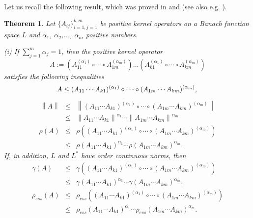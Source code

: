 \documentclass[12pt, reqno]{amsart}
\newtheorem{theorem}{Theorem}[section]
\theoremstyle{definition}
\theoremstyle{remark}
\numberwithin{equation}{section}
\newcommand{\be}{\begin{equation}}
\newcommand{\ee}{\end{equation}}
\begin{document}
 Let us recall  the following result, which was proved in \cite[Theorem 2.2]{DP05} and
\cite[Theorem 5.1 and Example 3.7]{P06} (see also e.g. \cite[Theorem 2.1]{P17}).

\begin{theorem}
\label{thbegin}
Let $\{A_{i j}\}_{i=1, j=1}^{k, m}$ be positive kernel operators on a Banach function space $L$ and  $\alpha _1$, $\alpha _2$,..., $\alpha _m$  positive numbers.

\noindent (i) If %
$\sum_{j=1}^{m} \alpha _j = 1$, then the positive kernel operator
\be
A:= \left(A_{1 1}^{(\alpha _1)} \circ \cdots \circ A_{1 m}^{(\alpha _m)}\right) \ldots \left(A_{k 1}^{(\alpha _1)} \circ \cdots \circ A_{k m}^{(\alpha _m)} \right)
\label{osnovno}
\ee
satisfies the following inequalities
\begin{equation}
A \le
(A_{1 1} \cdots  A_{k 1})^{(\alpha _1)} \circ \cdots
\circ (A_{1 m} \cdots A_{k m})^{(\alpha _m)} , \\
\label{norm2}
\end{equation}
\begin{eqnarray}
\nonumber
\left\|A \right\| &\le &\left\|(A_{1 1} \cdots  A_{k 1})^{(\alpha _1)} \circ \cdots
\circ (A_{1 m} \cdots A_{k m})^{(\alpha _m)} \right\|\\
&\le&\left\|A_{1 1} \cdots  A_{k 1}\right\|^{\alpha _1}\cdots\left\|A_{1 m} \cdots  A_{k m}\right\|^{\alpha _m}
\label{spectral2}
\end{eqnarray}
\begin{eqnarray}
\nonumber
\rho \left(A \right)& \le &\rho \left((A_{1 1} \cdots  A_{k 1})^{(\alpha _1)} \circ \cdots
\circ (A_{1 m} \cdots A_{k m})^{(\alpha _m)}\right)\\
&\le&\rho \left( A_{1 1} \cdots  A_{k 1} \right)^{\alpha _1} \cdots
\rho \left( A_{1 m} \cdots A_{k m}\right)^{\alpha _m} .
\label{tri}
\end{eqnarray}
If, in addition, $L$ and $L^*$ have order continuous norms, then%
\begin{eqnarray}
\nonumber
\gamma (A) & \le &\gamma \left((A_{1 1} \cdots  A_{k 1})^{(\alpha _1)} \circ \cdots
\circ (A_{1 m} \cdots A_{k m})^{(\alpha _m)}\right)\\
 &\le &
 \label{meas_noncomp}
\gamma (A_{1 1} \cdots  A_{k 1})^{\alpha _1} \cdots \gamma(A_{1 m} \cdots A_{k m})^{\alpha _m}, \\
\nonumber
\rho _{ess} \left(A \right) & \le &\rho _{ess} \left((A_{1 1} \cdots  A_{k 1})^{(\alpha _1)} \circ \cdots
\circ (A_{1 m} \cdots A_{k m})^{(\alpha _m)}\right)\\
&\le  &
\label{ess_spectral}
\rho _{ess} \left( A_{1 1} \cdots  A_{k 1} \right)^{\alpha _1} \cdots
\rho _{ess} \left( A_{1 m} \cdots A_{k m}\right)^{\alpha _m} .
\end{eqnarray}



\end{theorem}
\end{document}
